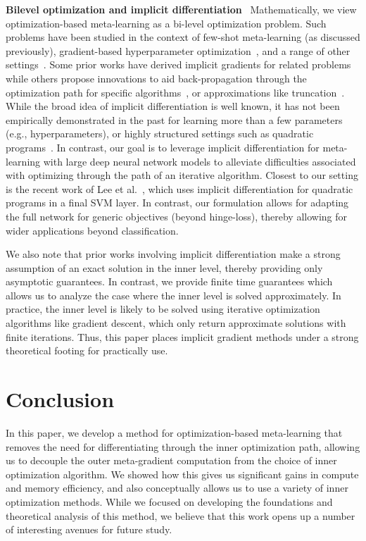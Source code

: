 \documentclass{article} \usepackage[nonatbib, final]{mod_neurips}
\begin{document}
\textbf{Bilevel optimization and implicit differentiation} \
Mathematically, we view optimization-based meta-learning as a bi-level optimization problem. Such problems have been studied in the context of few-shot meta-learning (as discussed previously), gradient-based hyperparameter optimization~\cite{maclaurin2015gradient, pedregosa2016hyperparameter, franceschi2017forward, domke2012, Do2007EfficientMH}, and a range of other settings~\cite{amos2017optnet,landry2019differentiable}. Some prior works have derived implicit gradients for related problems~\cite{pedregosa2016hyperparameter, domke2012, amos2017optnet} while others propose innovations to aid back-propagation through the optimization path for specific algorithms~\cite{maclaurin2015gradient, franceschi2017forward,Hascot2006EnablingUC}, or approximations like truncation~\cite{Shaban2018TruncatedBF}. While the broad idea of implicit differentiation is well known, it has not been empirically demonstrated in the past for learning more than a few parameters (e.g., hyperparameters), or highly structured settings such as quadratic programs~\cite{amos2017optnet}. In contrast, our goal is to leverage implicit differentiation for meta-learning with large deep neural network models to alleviate difficulties associated with optimizing through the path of an iterative algorithm.
Closest to our setting is the recent work of Lee et al.~\cite{lee2019meta}, which uses implicit differentiation for quadratic programs in a final SVM layer. In contrast, our formulation allows for adapting the full network for generic objectives (beyond hinge-loss), thereby allowing for wider applications beyond classification. 

We also note that prior works involving implicit differentiation make a strong assumption of an exact solution in the inner level, thereby providing only asymptotic guarantees. In contrast, we provide finite time guarantees which allows us to analyze the case where the inner level is solved approximately. In practice, the inner level is likely to be solved using iterative optimization algorithms like gradient descent, which only return approximate solutions with finite iterations. Thus, this paper places implicit gradient methods under a strong theoretical footing for practically use.
\fi 
\section{Conclusion}

In this paper, we develop a method for optimization-based meta-learning that removes the need for differentiating through the inner optimization path, allowing us to decouple the outer meta-gradient computation from the choice of inner optimization algorithm. We showed how this gives us significant gains in compute and memory efficiency, and also conceptually allows us to use a variety of inner optimization methods. While we focused on developing the foundations and theoretical analysis of this method, we believe that this work opens up a number of interesting avenues for future study.
\end{document}
